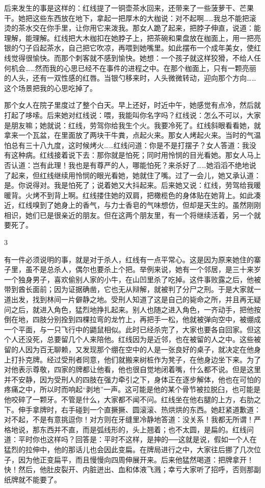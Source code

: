 后来发生的事是这样的：红线提了一铜壶茶水回来，还带来了一些菠萝干、芒果干。她把这些东西放在地下，拿起一把厚木的大枷说：对不起啊……我总不能把滚烫的茶水交在你手里，让你用它来泼我。那女人跪了起来，把脖子伸直，说道：能理解，能理解。红线把大木枷扣在她脖子上，把茶碗和果盘放在枷面上，用一把亮银的勺子舀起茶水，自己把它吹凉，再喂到她嘴里。如此摆布一个成年美女，使红线觉得很愉快。而那个刺客就不感到愉快。她想：一个孩子就这样狡猾，不给人任何机会……然而我的心思已经不在事件的进程之中。在那个枷面上，只有一颗亮丽的人头，还有一双性感的红唇。当银勺移来时，人头微微转动，迎向那个方向……这个场景把我的心思吃掉了。 

那个女人在院子里度过了整个白天。早上还好，时近中午，她感觉有点冷，然后就打起了哆嗦。后来她对红线说：喂，我能叫你名字吗？红线说：怎么不可以，大家是朋友嘛；她就说：红线，劳驾你给我生个火。我要冷死了。红线斜眼看看她，就拿来一个瓦盆，在里面放了两块干牛粪，点起火来。那女人烤起火来。当时的气温怕总有三十八九度，这时候烤火……红线问道：你是不是打摆子？女人答道：我没有这种病。红线接着说下去：那你就是怕死；同时用怜悯的目光看她。那女人马上否认道：岂有此理！我也是有尊严的人，哪能怕死？来杀好了……她滔滔不绝地说了起来，但红线继续用怜悯的眼光看她，她就住了嘴。过了一会儿，她又承认道：是。你说得对。我是怕死了；说着她又大抖起来。后来她又说：红线，劳驾给我暖暖背。火烤不到背上啊。红线搂住她的双肩，把橄榄色的身体贴在她背上。如此凑近，红线嗅到了她身上的香气，与力士香皂的气味想仿，但却是天生的。虽然刚刚相识，她们已是很亲近的朋友。但在这两个朋友里，有一个将继续活着，另一个就要死了。 

3 

有一件必须说明的事，就是对于杀人，红线有一点平常心。这是因为原来她住的寨子里，虽不是总杀人，偶尔也要杀上个把。举例来说，她有一个邻居，是三十来岁一个独身男子，喜欢偷别人家的小牛，在山凹里杀了吃掉。这件事败露之后，他被带到酋长面前；因为证据确凿，它也无从辩解，就被判了分尸之刑。于是大家就一道出发，找到林间一片僻静之地。受刑人知道了这是自己的毙命之所，并且再无疑问之后，就进入角色，猛烈地挣扎起来。别人也随之进入角色，一齐动手，把他按倒在地，四肢分别拴到四棵拉弯的龙竹上，再把手一松，他就被弹向空中，被绷成一个平面，与一只飞行中的鼯鼠相似。此时已经杀完了，大家也要各自回家。但这个人还没死，总要留几个人来陪他。红线因为是近邻，也在被留的人之中。这些被留的人因为百无聊赖，又发现那个绷在空中的人是一张良好的桌子，就决定在他身上打扑克牌。经过受刑者同意，他们就搬来树桩作为凳子，在他身边坐下来。为了对他表示尊敬，四家的牌都让他看，他也很自觉地闭着嘴，什么都不说。但是这里并不安静，因为受刑人的四肢在强力牵引之下，身体正在逐步解体，他也在可怕的疼痛之中，所以时而响起“剥地”一声。这可能是他的某个骨节被拉脱臼，也可能是他咬碎了一颗牙。不管是什么，大家都不闻不问。红线坐在他右腿的上方，右肋之下。伸手拿牌时，右手碰到一个直撅撅、圆滚滚、热烘烘的东西。她赶紧道歉道：对不起，不是有意挑逗你！对方则在牙缝里冷静地答道：没关系！我都无所谓！严格地说，那东西并不直，而是弧线形的，头上翘着；也不太圆，是扁的。红线问道：平时你也这样吗？回答是：平时不这样，是抻的──这就是说，假如一个人在猛烈的拉伸中，他的那话儿也会因此变扁。在牌局进行之中，大家往后挪了几次位子，因为他正变扁平，而且慢慢向四周伸展开来。后来他猛然喝道：把牌拿开！快！然后，他肚皮裂开、内脏迸出、血和体液飞溅；幸亏大家听了招呼，否则那副纸牌就不能要了。 

